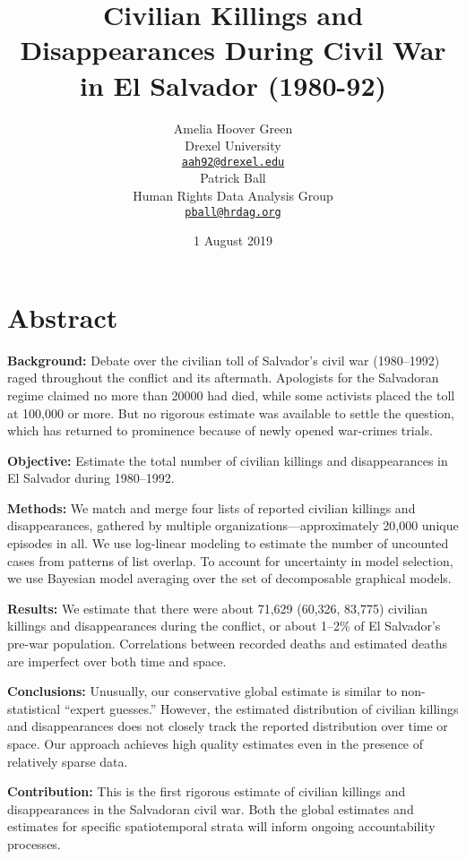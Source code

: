 \documentclass[11pt,]{article}
\title{Civilian Killings and Disappearances During Civil War in El Salvador
(1980-92)}
\author{Amelia Hoover Green \\ Drexel University \\ \href{mailto:aah92@drexel.edu}{\nolinkurl{aah92@drexel.edu}} \\ Patrick Ball \\ Human Rights Data Analysis Group \\ \href{mailto:pball@hrdag.org}{\nolinkurl{pball@hrdag.org}}}
\date{1 August 2019}
\begin{document}
\maketitle

\pagebreak

\hypertarget{abstract}{%
\section{Abstract}\label{abstract}}

\textbf{Background:} Debate over the civilian toll of Salvador's civil
war (1980--1992) raged throughout the conflict and its aftermath.
Apologists for the Salvadoran regime claimed no more than 20000 had
died, while some activists placed the toll at 100,000 or more. But no
rigorous estimate was available to settle the question, which has
returned to prominence because of newly opened war-crimes trials.

\textbf{Objective:} Estimate the total number of civilian killings and
disappearances in El Salvador during 1980--1992.

\textbf{Methods:} We match and merge four lists of reported civilian
killings and disappearances, gathered by multiple
organizations---approximately 20,000 unique episodes in all. We use
log-linear modeling to estimate the number of uncounted cases from
patterns of list overlap. To account for uncertainty in model selection,
we use Bayesian model averaging over the set of decomposable graphical
models.

\textbf{Results:} We estimate that there were about 71,629 (60,326,
83,775) civilian killings and disappearances during the conflict, or
about 1--2\% of El Salvador's pre-war population. Correlations between
recorded deaths and estimated deaths are imperfect over both time and
space.

\textbf{Conclusions:} Unusually, our conservative global estimate is
similar to non-statistical ``expert guesses.'' However, the estimated
distribution of civilian killings and disappearances does not closely
track the reported distribution over time or space. Our approach
achieves high quality estimates even in the presence of relatively
sparse data.

\textbf{Contribution:} This is the first rigorous estimate of civilian
killings and disappearances in the Salvadoran civil war. Both the global
estimates and estimates for specific spatiotemporal strata will inform
ongoing accountability processes.

\pagebreak
\setlength\parindent{24pt}
\end{document}

